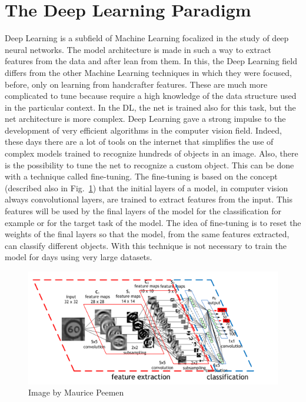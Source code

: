 \documentclass[12pt]{report}
\begin{document}
\section{The Deep Learning Paradigm}

Deep Learning is a subfield of Machine Learning focalized in the study of deep neural networks.
The model architecture is made in such a way to extract features from the data and after lean from them.
In this, the Deep Learning field differs from the other Machine Learning techniques in which they were focused, before, only on
learning from handcrafter features. These are much more complicated to tune because require a high knowledge
of the data structure used in the particular context. In the DL, the net is trained also for this task, but the net architecture
is more complex.
Deep Learning gave a strong impulse to the development of very efficient algorithms in the computer vision field. 
Indeed, these days there are a lot of tools on the internet that simplifies the use of complex models trained to 
recognize hundreds of objects in an image. Also, there is the possibility to tune the net to recognize a custom object.
This can be done with a technique called fine-tuning. 
The fine-tuning is based on the concept (described also in Fig.~\ref{fig:dl-architecture}) that the initial layers of a model, 
in computer vision always convolutional layers, are trained to extract features from the input. 
This features will be used by the final layers of the model for the classification for example or for the target task of the model. The idea of fine-tuning is to reset the weights of the final layers so that the model, from the same features extracted, can classify different objects. With this technique is not necessary to train the model for days using very large datasets. 
\begin{figure}[t]
    \centering
    \includegraphics[scale=1.2]{dlarchitecture.png}
    \caption{Image by Maurice Peemen}
    \label{fig:dl-architecture}
\end{figure}
\end{document}
